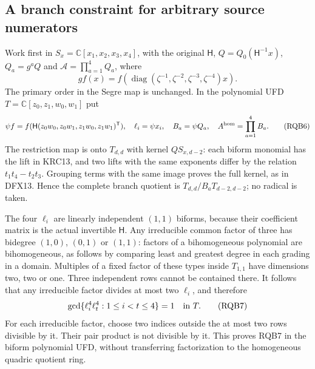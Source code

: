 \documentclass[11pt,a4paper]{article}
\begin{document}
\subsection{A branch constraint for arbitrary source numerators}

Work first in $S_x=\mathbb C[x_1,x_2,x_3,x_4]$, with the original
$\mathsf H$, $Q=Q_0(\mathsf H^{-1}x)$, $Q_a=g^aQ$ and
$\mathcal A=\prod_{a=1}^4Q_a$, where
\[
 g f(x)=f(\operatorname{diag}(\zeta^{-1},
               \zeta^{-2},\zeta^{-3},\zeta^{-4})x).
\]
The primary order in the Segre map is unchanged. In the polynomial
UFD $T=\mathbb C[z_0,z_1,w_0,w_1]$ put
\[
 \psi f=f(\mathsf H(z_0w_0,z_0w_1,z_1w_0,z_1w_1)^{\mathsf T}),
 \quad \ell_i=\psi x_i,\quad B_a=\psi Q_a,\quad
 A^{\rm hom}=\prod_{a=1}^4B_a .
 \tag{RQB6}
\]
The restriction map is onto $T_{d,d}$ with kernel $QS_{x,d-2}$:
each biform monomial has the lift in KRC13, and two lifts with
the same exponents differ by the relation $t_1t_4-t_2t_3$.
Grouping terms with the same image proves the full kernel, as in
DFX13. Hence the complete branch quotient is
$T_{d,d}/B_aT_{d-2,d-2}$; no radical is taken.

The four $\ell_i$ are linearly independent $(1,1)$ biforms,
because their coefficient matrix is the actual invertible $\mathsf H$.
Any irreducible common factor of three has bidegree $(1,0)$,
$(0,1)$ or $(1,1)$: factors of a bihomogeneous polynomial are
bihomogeneous, as follows by comparing least and greatest degree
in each grading in a domain. Multiples of a fixed factor of these
types inside $T_{1,1}$ have dimensions two, two or one.
Three independent rows cannot be contained there. It follows that
any irreducible factor divides at most two $\ell_i$, and therefore
\[
       \gcd\{\ell_i^4\ell_t^4:1\le i<t\le4\}=1
                         \quad\hbox{in }T .
 \tag{RQB7}
\]
For each irreducible factor, choose two indices outside the at most
two rows divisible by it. Their pair product is not divisible by it.
This proves RQB7 in the biform polynomial UFD, without transferring
factorization to the homogeneous quadric quotient ring.
\end{document}
